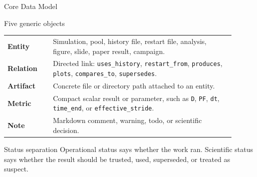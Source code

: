 \documentclass[aspectratio=169,11pt]{beamer}
\newcommand{\code}[1]{\texttt{#1}}
\newcommand{\relation}[1]{\textcolor{datamakBlue}{\texttt{#1}}}
\begin{document}
\begin{frame}{Core Data Model}
  \begin{block}{Five generic objects}
    \small
    \begin{tabular}{>{\bfseries}p{0.18\linewidth}p{0.72\linewidth}}
      \toprule
      Entity & Simulation, pool, history file, restart file, analysis, figure, slide, paper result, campaign. \\
      Relation & Directed link: \relation{uses\_history}, \relation{restart\_from}, \relation{produces}, \relation{plots}, \relation{compares\_to}, \relation{supersedes}. \\
      Artifact & Concrete file or directory path attached to an entity. \\
      Metric & Compact scalar result or parameter, such as \code{D}, \code{PF}, \code{dt}, \code{time\_end}, or \code{effective\_stride}. \\
      Note & Markdown comment, warning, todo, or scientific decision. \\
      \bottomrule
    \end{tabular}
  \end{block}

  \begin{block}{Status separation}
    \small
    Operational status says whether the work ran.  Scientific status says
    whether the result should be trusted, used, superseded, or treated as
    suspect.
  \end{block}
\end{frame}
\end{document}
